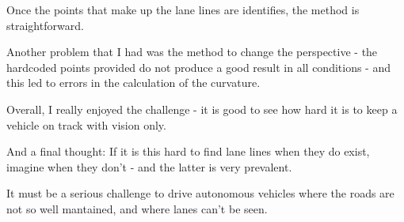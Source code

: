 \documentclass[11pt]{article}
\begin{document}
Once the points that make up the lane lines are identifies, the method
is straightforward.

Another problem that I had was the method to change the perspective -
the hardcoded points provided do not produce a good result in all
conditions - and this led to errors in the calculation of the curvature.

Overall, I really enjoyed the challenge - it is good to see how hard it
is to keep a vehicle on track with vision only.

And a final thought: If it is this hard to find lane lines when they do
exist, imagine when they don't - and the latter is very prevalent.

It must be a serious challenge to drive autonomous vehicles where the
roads are not so well mantained, and where lanes can't be seen.


    
    
    
    
\end{document}
